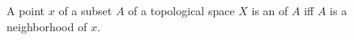 A point $x$ of a subset $A$ of a topological space $X$ is an  of $A$ iff $A$ is a neighborhood of $x$.
